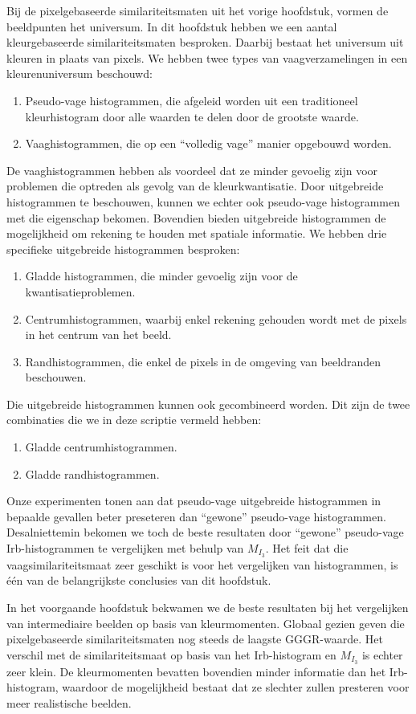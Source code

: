 Bij de pixelgebaseerde similariteitsmaten uit het vorige hoofdstuk, vormen de beeldpunten
het universum. In dit hoofdstuk hebben we een aantal kleurgebaseerde similariteitsmaten 
besproken. Daarbij bestaat het universum uit kleuren in plaats van pixels. 
We hebben twee types van vaagverzamelingen in een kleurenuniversum beschouwd:
\begin{enumerate}
  \item Pseudo-vage histogrammen, die afgeleid worden uit een traditioneel
  kleurhistogram door alle waarden te delen door de grootste waarde.
  \item Vaaghistogrammen, die op een ``volledig vage'' manier opgebouwd worden.
\end{enumerate}
De vaaghistogrammen hebben als voordeel dat ze minder gevoelig zijn voor problemen
die optreden als gevolg van de kleurkwantisatie. Door uitgebreide histogrammen
te beschouwen, kunnen we echter ook pseudo-vage histogrammen met die eigenschap
bekomen. Bovendien bieden uitgebreide histogrammen de mogelijkheid om rekening te houden
met spatiale informatie. We hebben drie specifieke uitgebreide histogrammen
besproken: 
\begin{enumerate}
  \item Gladde histogrammen, die minder gevoelig zijn voor de kwantisatieproblemen.
  \item Centrumhistogrammen, waarbij enkel rekening gehouden wordt met de pixels
  in het centrum van het beeld.
  \item Randhistogrammen, die enkel de pixels in de omgeving van beeldranden beschouwen.
\end{enumerate}
Die uitgebreide histogrammen kunnen ook gecombineerd worden. Dit zijn de twee combinaties
die we in deze scriptie vermeld hebben:
\begin{enumerate}
  \item Gladde centrumhistogrammen.
  \item Gladde randhistogrammen.
\end{enumerate}

Onze experimenten tonen aan dat pseudo-vage uitgebreide histogrammen in bepaalde gevallen 
beter preseteren dan ``gewone'' pseudo-vage histogrammen. Desalniettemin bekomen
we toch de beste resultaten door ``gewone'' pseudo-vage Irb-histogrammen te 
vergelijken met behulp van $M_{I_3}$. Het feit dat die vaagsimilariteitsmaat
zeer geschikt is voor het vergelijken van histogrammen, is \'e\'en van de
belangrijkste conclusies van dit hoofdstuk.

In het voorgaande hoofdstuk bekwamen we de beste resultaten bij het
vergelijken van intermediaire beelden op basis van kleurmomenten. 
Globaal gezien geven die pixelgebaseerde similariteitsmaten nog steeds de laagste
GGGR-waarde. Het verschil met de similariteitsmaat op basis van het Irb-histogram en
$M_{I_3}$ is echter zeer klein. De kleurmomenten bevatten bovendien minder informatie dan
het Irb-histogram, waardoor de mogelijkheid bestaat dat ze slechter zullen presteren 
voor meer realistische beelden.